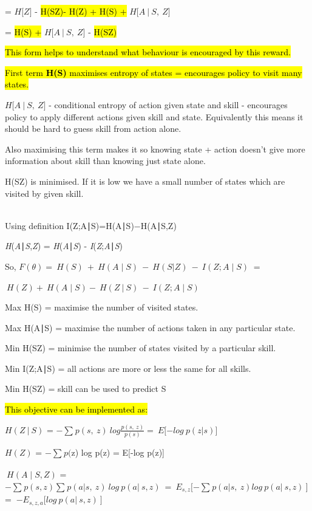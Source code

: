 = $H\lbrack Z\rbrack$ - \hl{H(S\textbar Z)- H(Z) + H(S) +} $H\lbrack A\ |\ S,\ Z\rbrack$

= \hl{H(S) +} $H\lbrack A\ |\ S,\ Z\rbrack$ - \hl{H(S\textbar Z)}

\hl{This form helps to understand what behaviour is encouraged by this reward.}

\hl{First term \textbf{H(S)} maximises entropy of states = encourages policy to visit many states.}

$H\lbrack A\ |\ S,\ Z\rbrack$ - conditional entropy of action given state and skill - encourages policy to apply different actions given skill and state. Equivalently this means it should be hard to guess skill from action alone.

Also maximising this term makes it so knowing state + action doesn't give more information about skill than knowing just state alone.

H(S\textbar Z) is minimised. If it is low we have a small number of states which are visited by given skill.\\
\strut \\
Using definition I(Z;A∣S)=H(A∣S)−H(A∣S,Z)

\emph{H}(\emph{A}∣\emph{S},\emph{Z}) = \emph{H}(\emph{A}∣\emph{S}) - \emph{I}(\emph{Z};\emph{A}∣\emph{S})

So, $F(\theta) = \ H(S)\  + \ H(A \mid S)\  - \ H(S|Z)\  - \ I(Z;A \mid S)\ $ =

$\ H(Z) + \ H(A \mid S) - \ H(Z\ |\ S)\  - \ I(Z;A \mid S)$

Max H(S) = maximise the number of visited states.

Max H(A∣S) = maximise the number of actions taken in any particular state.

Min H(S\textbar Z) = minimise the number of states visited by a particular skill.

Min I(Z;A∣S) = all actions are more or less the same for all skills.

Min H(S\textbar Z) = skill can be used to predict S

\hl{\hfill\break
This objective can be implemented as:}

$H(Z\ |\ S)$ = $- \sum_{}^{}p(s,\ z)\ log\frac{p(s,\ z)}{p(s)} = \ E\lbrack - log\ p(z|s)\rbrack$

$H(Z)$ = $- \sum_{}^{}p($z) log p(z) = E{[}-log p(z){]}

$\ H(A \mid S,Z)$ = $- \sum_{}^{}p(s,z)\sum_{}^{}p(a|s,\ z)\ log\ p(a|\ s,z)\  = \ E_{s,z}\lbrack - \sum_{}^{}p(a|s,\ z)log\ p(a|\ s,z)\ \rbrack\ $ = $\ {- E}_{s,z,a}\lbrack log\ p(a|\ s,z)\ \rbrack$

